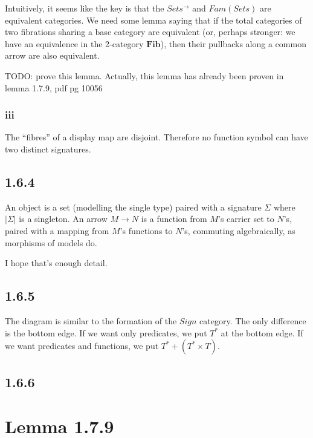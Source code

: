 \documentclass{article}
\newcommand{\mbf}{\mathbf}
\begin{document}
Intuitively, it seems like the key is that the $Sets^{\to}$ and $Fam(Sets)$ are equivalent categories.
We need some lemma saying that if the total categories of two fibrations sharing a base category are equivalent
(or, perhaps stronger: we have an equivalence in the 2-category $\mbf{Fib}$), then their pullbacks along a common arrow
are also equivalent.

TODO: prove this lemma. Actually, this lemma has already been proven in lemma 1.7.9, pdf pg 10056

\subsubsection*{iii}

The ``fibres'' of a display map are disjoint. Therefore no function symbol can have two distinct signatures.

\subsection*{1.6.4}

An object is a set (modelling the single type) paired with a signature $\Sigma$ where $|\Sigma|$ is a singleton.
An arrow $M \to N$ is a function from $M$'s carrier set to $N$'s, paired with a mapping from $M$'s functions to $N$'s,
commuting algebraically, as morphisms of models do.

I hope that's enough detail.

\subsection*{1.6.5}

The diagram is similar to the formation of the $Sign$ category. The only difference is the bottom edge.
If we want only predicates, we put $T^*$ at the bottom edge. If we want predicates and functions,
we put $T^* + (T^* \times T)$.

\subsection*{1.6.6}


\section*{Lemma 1.7.9}
\end{document}
